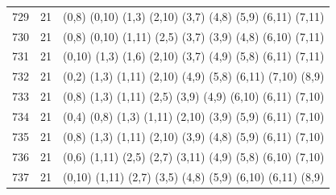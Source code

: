 \begin{appendix}
{\begin{longtable}{lll}
    729& 21 & (0,8)   (0,10)  (1,3)   (2,10)  (3,7)   (4,8)   (5,9)   (6,11)  (7,11)\\
    730& 21 & (0,8)   (0,10)  (1,11)  (2,5)   (3,7)   (3,9)   (4,8)   (6,10)  (7,11)\\
    731& 21 & (0,10)  (1,3)   (1,6)   (2,10)  (3,7)   (4,9)   (5,8)   (6,11)  (7,11)\\
    732& 21 & (0,2)   (1,3)   (1,11)  (2,10)  (4,9)   (5,8)   (6,11)  (7,10)  (8,9)\\
    733& 21 & (0,8)   (1,3)   (1,11)  (2,5)   (3,9)   (4,9)   (6,10)  (6,11)  (7,10)\\
    734& 21 & (0,4)   (0,8)   (1,3)   (1,11)  (2,10)  (3,9)   (5,9)   (6,11)  (7,10)\\
    735& 21 & (0,8)   (1,3)   (1,11)  (2,10)  (3,9)   (4,8)   (5,9)   (6,11)  (7,10)\\
    736& 21 & (0,6)   (1,11)  (2,5)   (2,7)   (3,11)  (4,9)   (5,8)   (6,10)  (7,10)\\
    737& 21 & (0,10)  (1,11)  (2,7)   (3,5)   (4,8)   (5,9)   (6,10)  (6,11)  (8,9)
\end{longtable}}



\end{appendix}
